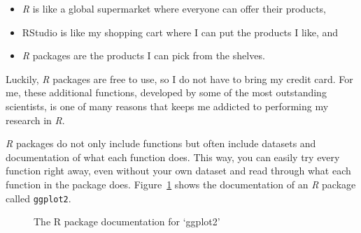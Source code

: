 \documentclass[
  letterpaper,
]{krantz}
\begin{document}
\begin{itemize}
\item
  \emph{R} is like a global supermarket where everyone can offer their
  products,
\item
  RStudio is like my shopping cart where I can put the products I like,
  and
\item
  \emph{R} packages are the products I can pick from the shelves.
\end{itemize}

Luckily, \emph{R} packages are free to use, so I do not have to bring my
credit card. For me, these additional functions, developed by some of
the most outstanding scientists, is one of many reasons that keeps me
addicted to performing my research in \emph{R}.

\emph{R} packages do not only include functions but often include
datasets and documentation of what each function does. This way, you can
easily try every function right away, even without your own dataset and
read through what each function in the package does.
Figure~\ref{fig-img-r-package-documentation} shows the documentation of
an \emph{R} package called \texttt{ggplot2}.

\begin{figure}


\caption{\label{fig-img-r-package-documentation}The R package
documentation for `ggplot2'}

\end{figure}%
\end{document}
